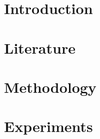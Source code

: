 \documentclass[twoside]{ctuthesis}
\theoremstyle{plain}
\theoremstyle{definition}
\theoremstyle{note}
\begin{document}
\maketitle

\chapter{Introduction}


\chapter{Literature}







\chapter{Methodology}


\chapter{Experiments}


\appendix

\printindex





\end{document}
